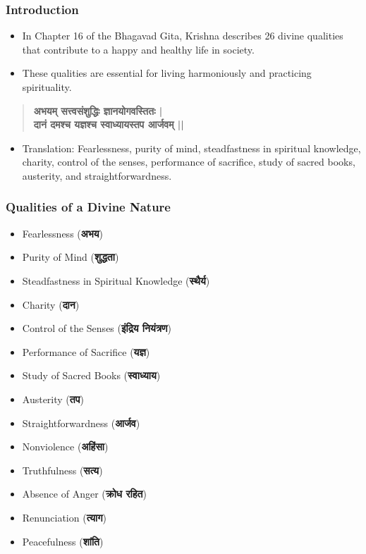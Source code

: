 \begin{frame}[fragile]\frametitle{Introduction}
    \begin{itemize}
        \item In Chapter 16 of the Bhagavad Gita, Krishna describes 26 divine qualities that contribute to a happy and healthy life in society.
        \item These qualities are essential for living harmoniously and practicing spirituality.
    \end{itemize}
    \begin{quote}
        \textbf{अभयम् सत्त्वसंशुद्धिः ज्ञानयोगवस्तितः |}\\
        \textbf{दानं दमश्च यज्ञश्च स्वाध्यायस्तप आर्जवम् ||}
    \end{quote}
    \begin{itemize}
        \item Translation: Fearlessness, purity of mind, steadfastness in spiritual knowledge, charity, control of the senses, performance of sacrifice, study of sacred books, austerity, and straightforwardness.
    \end{itemize}
\end{frame}

\begin{frame}[fragile]\frametitle{Qualities of a Divine Nature}
    \begin{itemize}
        \item Fearlessness (\textbf{अभय})
        \item Purity of Mind (\textbf{शुद्धता})
        \item Steadfastness in Spiritual Knowledge (\textbf{स्थैर्य})
        \item Charity (\textbf{दान})
        \item Control of the Senses (\textbf{इंद्रिय नियंत्रण})
        \item Performance of Sacrifice (\textbf{यज्ञ})
        \item Study of Sacred Books (\textbf{स्वाध्याय})
        \item Austerity (\textbf{तप})
        \item Straightforwardness (\textbf{आर्जव})
        \item Nonviolence (\textbf{अहिंसा})
        \item Truthfulness (\textbf{सत्य})
        \item Absence of Anger (\textbf{क्रोध रहित})
        \item Renunciation (\textbf{त्याग})
        \item Peacefulness (\textbf{शांति})
    \end{itemize}
\end{frame}

